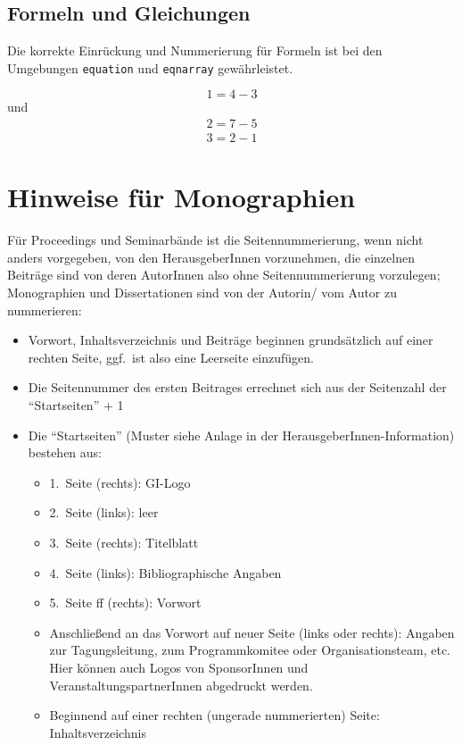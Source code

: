 \documentclass{lni}
\begin{document}
\subsection{Formeln und Gleichungen}

Die korrekte Einrückung und Nummerierung für Formeln ist bei den Umgebungen \texttt{equation} und \texttt{eqnarray} gewährleistet.

\begin{equation}
  1=4-3
\end{equation}
und
\begin{eqnarray}
  2=7-5\\
  3=2-1
\end{eqnarray}

\section{Hinweise für Monographien}
\label{sec:monographien}
Für Proceedings und Seminarbände ist die Seitennummerierung, wenn nicht anders vorgegeben, von den HerausgeberInnen vorzunehmen, die einzelnen Beiträge sind von deren AutorInnen also ohne Seitennummerierung vorzulegen; Monographien und Dissertationen sind von der Autorin/ vom Autor zu nummerieren:
\begin{itemize}
\item Vorwort, Inhaltsverzeichnis und Beiträge beginnen grundsätzlich auf einer rechten Seite, ggf.\ ist also eine Leerseite einzufügen.
\item Die Seitennummer des ersten Beitrages errechnet sich aus der Seitenzahl der \enquote{Startseiten} + 1
\item Die \enquote{Startseiten} (Muster siehe Anlage in der HerausgeberInnen-Information) bestehen aus:
\begin{itemize}
\item 1.\ Seite (rechts): GI-Logo
\item 2.\ Seite (links): leer
\item 3.\ Seite (rechts): Titelblatt
\item 4.\ Seite (links): Bibliographische Angaben
\item 5.\ Seite ff (rechts): Vorwort
\item Anschließend an das Vorwort auf neuer Seite (links oder rechts): Angaben zur Tagungsleitung, zum Programmkomitee oder Organisationsteam, etc. Hier können auch Logos von SponsorInnen und VeranstaltungspartnerInnen abgedruckt werden.
\item Beginnend auf einer rechten (ungerade nummerierten) Seite: Inhaltsverzeichnis
\end{itemize}
\end{itemize}

\printbibliography
\end{document}
